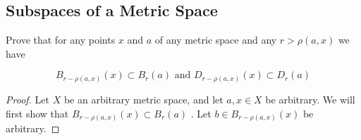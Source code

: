 \subsection{Subspaces of a Metric Space}


\begin{majorEx}%
  Prove that for any points $x$ and $a$ of any metric space and any $r
  > \rho(a,x)$ we have

  $$B_{r-\rho(a,x)}(x) \subset B_r(a) \text{  and  }
  D_{r-\rho(a,x)}(x) \subset D_r(a)$$
\end{majorEx}

\begin{proof}
  Let $X$ be an arbitrary metric space, and let $a,x\in X$ be
  arbitrary.
  We will first show that 
  $B_{r-\rho(a,x)}(x) \subset B_r(a)$ . Let $b \in B_{r-\rho(a,x)}(x)$
  be arbitrary.
  
\end{proof}